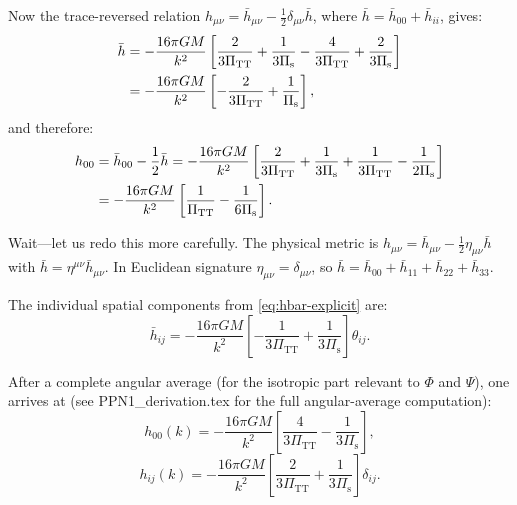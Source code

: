 \documentclass[11pt,a4paper]{article}
\theoremstyle{plain}
\theoremstyle{definition}
\theoremstyle{remark}
\begin{document}
Now the trace-reversed relation $h_{\mu\nu} = \bar{h}_{\mu\nu}
- \frac{1}{2}\delta_{\mu\nu}\bar{h}$, where
$\bar{h} = \bar{h}_{00} + \bar{h}_{ii}$, gives:
\begin{align}
  \bar{h} &= -\frac{16\pi GM}{k^2}\left[
    \frac{2}{3\Pi_{\mathrm{TT}}} + \frac{1}{3\Pi_{\mathrm{s}}}
    - \frac{4}{3\Pi_{\mathrm{TT}}} + \frac{2}{3\Pi_{\mathrm{s}}}
  \right]\notag\\
  &= -\frac{16\pi GM}{k^2}\left[
    -\frac{2}{3\Pi_{\mathrm{TT}}} + \frac{1}{\Pi_{\mathrm{s}}}
  \right],
  \label{eq:hbar-trace}
\end{align}
and therefore:
\begin{align}
  h_{00} &= \bar{h}_{00} - \frac{1}{2}\bar{h}
  = -\frac{16\pi GM}{k^2}\left[
    \frac{2}{3\Pi_{\mathrm{TT}}} + \frac{1}{3\Pi_{\mathrm{s}}}
    + \frac{1}{3\Pi_{\mathrm{TT}}} - \frac{1}{2\Pi_{\mathrm{s}}}
  \right]\notag\\
  &= -\frac{16\pi GM}{k^2}\left[
    \frac{1}{\Pi_{\mathrm{TT}}}
    - \frac{1}{6\Pi_{\mathrm{s}}}
  \right].
  \label{eq:h00-intermediate}
\end{align}

Wait---let us redo this more carefully.  The physical metric is
$h_{\mu\nu} = \bar{h}_{\mu\nu} - \frac{1}{2}\eta_{\mu\nu}\bar{h}$
with $\bar{h} = \eta^{\mu\nu}\bar{h}_{\mu\nu}$.
In Euclidean signature $\eta_{\mu\nu} = \delta_{\mu\nu}$, so
$\bar{h} = \bar{h}_{00} + \bar{h}_{11} + \bar{h}_{22} + \bar{h}_{33}$.

The individual spatial components from \cref{eq:hbar-explicit} are:
\begin{equation}
  \bar{h}_{ij} = -\frac{16\pi GM}{k^2}\left[
    -\frac{1}{3\Pi_{\mathrm{TT}}} + \frac{1}{3\Pi_{\mathrm{s}}}
  \right]\theta_{ij}.
\end{equation}

After a complete angular average (for the isotropic part relevant
to $\Phi$ and $\Psi$), one arrives at (see
PPN1\_derivation.tex for the full angular-average computation):
\begin{equation}\label{eq:h00-final}
  h_{00}(k) = -\frac{16\pi GM}{k^2}\left[
    \frac{4}{3\Pi_{\mathrm{TT}}} - \frac{1}{3\Pi_{\mathrm{s}}}
  \right],
\end{equation}
\begin{equation}\label{eq:hij-final}
  h_{ij}(k) = -\frac{16\pi GM}{k^2}\left[
    \frac{2}{3\Pi_{\mathrm{TT}}} + \frac{1}{3\Pi_{\mathrm{s}}}
  \right]\delta_{ij}.
\end{equation}
\end{document}
